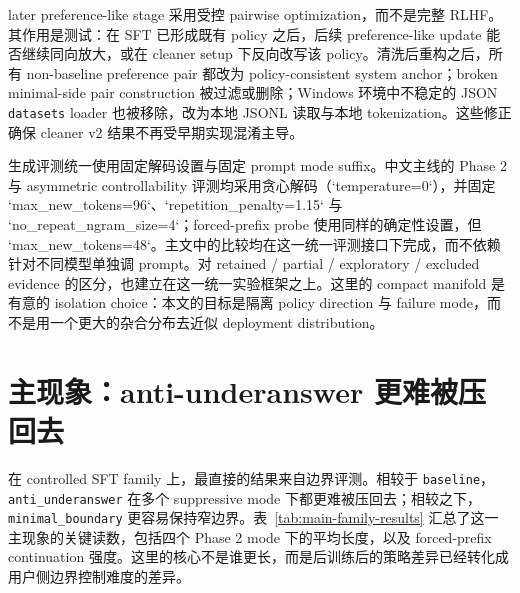 \documentclass[12pt]{ctexart}
\begin{document}
later preference-like stage 采用受控 pairwise optimization，而不是完整 RLHF。其作用是测试：在 SFT 已形成既有 policy 之后，后续 preference-like update 能否继续同向放大，或在 cleaner setup 下反向改写该 policy。清洗后重构之后，所有 non-baseline preference pair 都改为 policy-consistent system anchor；broken minimal-side pair construction 被过滤或删除；Windows 环境中不稳定的 JSON \texttt{datasets} loader 也被移除，改为本地 JSONL 读取与本地 tokenization。这些修正确保 cleaner v2 结果不再受早期实现混淆主导。

生成评测统一使用固定解码设置与固定 prompt mode suffix。中文主线的 Phase 2 与 asymmetric controllability 评测均采用贪心解码（`temperature=0`），并固定 `max\_new\_tokens=96`、`repetition\_penalty=1.15` 与 `no\_repeat\_ngram\_size=4`；forced-prefix probe 使用同样的确定性设置，但 `max\_new\_tokens=48`。主文中的比较均在这一统一评测接口下完成，而不依赖针对不同模型单独调 prompt。对 retained / partial / exploratory / excluded evidence 的区分，也建立在这一统一实验框架之上。这里的 compact manifold 是有意的 isolation choice：本文的目标是隔离 policy direction 与 failure mode，而不是用一个更大的杂合分布去近似 deployment distribution。

\section{主现象：anti-underanswer 更难被压回去}
\label{sec:phenomenon}

在 controlled SFT family 上，最直接的结果来自边界评测。相较于 \texttt{baseline}，\texttt{anti\_underanswer} 在多个 suppressive mode 下都更难被压回去；相较之下，\texttt{minimal\_boundary} 更容易保持窄边界。表~\ref{tab:main-family-results} 汇总了这一主现象的关键读数，包括四个 Phase 2 mode 下的平均长度，以及 forced-prefix continuation 强度。这里的核心不是谁更长，而是后训练后的策略差异已经转化成用户侧边界控制难度的差异。
\end{document}
